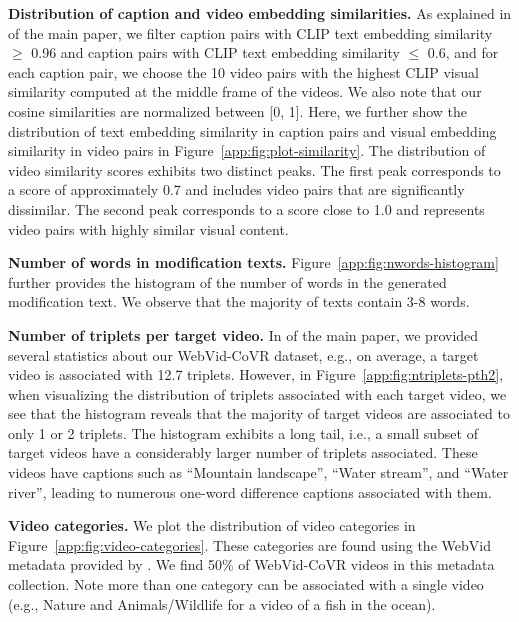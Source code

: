 \noindent\textbf{Distribution of caption and video embedding similarities.}
As explained in 
\if{} \fi
of the main paper,
we filter caption pairs with CLIP text embedding similarity $\ge$ 0.96 
and caption pairs with CLIP text embedding similarity $\le$ 0.6, and for each caption pair, we choose the 10 video pairs with the highest CLIP visual similarity computed at the middle frame of the videos.
We also note that our cosine similarities are normalized between [0, 1].
Here, we further show the distribution of text embedding similarity in caption pairs and visual embedding similarity in video pairs in Figure~\ref{app:fig:plot-similarity}.
The distribution of video similarity scores exhibits two distinct peaks. 
The first peak corresponds to a score of approximately 0.7 and includes video pairs that are significantly dissimilar.
The second peak corresponds to a score close to 1.0 and represents video pairs 
with highly similar visual content.

\noindent\textbf{Number of words in modification texts.}
Figure~\ref{app:fig:nwords-histogram} further provides the histogram of the
number of words in the generated modification text. We observe that the majority
of texts contain 3-8 words.

\noindent\textbf{Number of triplets per target video.}
In
\if{} \fi
of the main paper,
we provided several statistics about our WebVid-CoVR dataset, e.g., 
on average, a target video is associated with 12.7 triplets.
However, in Figure~\ref{app:fig:ntriplets-pth2}, when visualizing 
the distribution of triplets associated with each target video, we see that
the histogram reveals that the majority of target videos are associated to only 1 or 2 triplets. 
The histogram exhibits a long tail, i.e., a small subset of target videos have a considerably larger number of triplets associated. 
These videos have captions such as ``Mountain landscape'', ``Water stream'', and ``Water river'', leading to numerous one-word difference captions associated with them.
  
\noindent\textbf{Video categories.}
We plot the distribution of video categories in Figure~\ref{app:fig:video-categories}. These categories are found using the WebVid metadata provided by \cite{cleanvid}.
We find 50\% of WebVid-CoVR videos in this metadata collection. Note more than one category can be associated with a single video (e.g., Nature and Animals/Wildlife for a video of a fish in the ocean).


